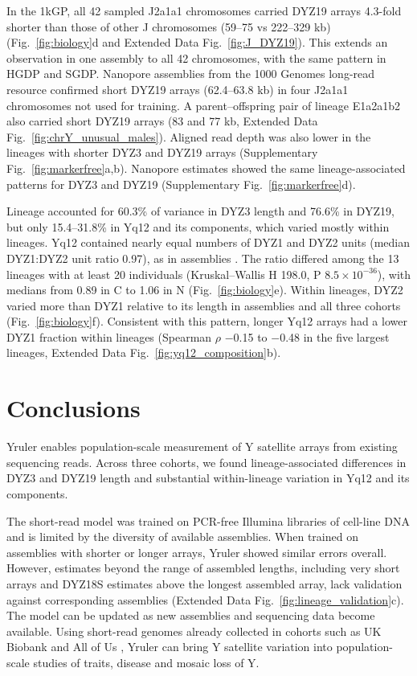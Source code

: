 In the 1kGP, all 42 sampled J2a1a1 chromosomes carried DYZ19 arrays 4.3-fold shorter than those of other J chromosomes (59--75 vs 222--329 kb) (Fig.~\ref{fig:biology}d and Extended Data Fig.~\ref{fig:J_DYZ19}). This extends an observation in one assembly \cite{Hallast2023} to all 42 chromosomes, with the same pattern in HGDP and SGDP. Nanopore assemblies from the 1000 Genomes long-read resource \cite{Gustafson2024} confirmed short DYZ19 arrays (62.4--63.8 kb) in four J2a1a1 chromosomes not used for training. A parent--offspring pair of lineage E1a2a1b2 also carried short DYZ19 arrays (83 and 77 kb, Extended Data Fig.~\ref{fig:chrY_unusual_males}). Aligned read depth was also lower in the lineages with shorter DYZ3 and DYZ19 arrays (Supplementary Fig.~\ref{fig:markerfree}a,b). Nanopore estimates showed the same lineage-associated patterns for DYZ3 and DYZ19 (Supplementary Fig.~\ref{fig:markerfree}d).

Lineage accounted for 60.3\% of variance in DYZ3 length and 76.6\% in DYZ19, but only 15.4--31.8\% in Yq12 and its components, which varied mostly within lineages. Yq12 contained nearly equal numbers of DYZ1 and DYZ2 units (median  DYZ1:DYZ2 unit ratio 0.97), as in assemblies \cite{Hallast2026}. The ratio differed among the 13 lineages with at least 20 individuals (Kruskal--Wallis H 198.0, P $8.5\times10^{-36}$), with medians from 0.89 in C to 1.06 in N (Fig.~\ref{fig:biology}e). Within lineages, DYZ2 varied more than DYZ1 relative to its length in assemblies \cite{Hallast2026} and all three cohorts (Fig.~\ref{fig:biology}f). Consistent with this pattern, longer Yq12 arrays had a lower DYZ1 fraction within lineages (Spearman $\rho$ $-$0.15 to $-$0.48 in the five largest lineages, Extended Data Fig.~\ref{fig:yq12_composition}b).

\section*{Conclusions}
Yruler enables population-scale measurement of Y satellite arrays from existing sequencing reads. Across three cohorts, we found lineage-associated differences in DYZ3 and DYZ19 length and substantial within-lineage variation in Yq12 and its components.

The short-read model was trained on PCR-free Illumina libraries of cell-line DNA and is limited by the diversity of available assemblies. When trained on assemblies with shorter or longer arrays, Yruler showed similar errors overall. However, estimates beyond the range of assembled lengths, including very short arrays and DYZ18S estimates above the longest assembled array, lack validation against corresponding assemblies (Extended Data Fig.~\ref{fig:lineage_validation}c). The model can be updated as new assemblies and sequencing data become available. Using short-read genomes already collected in cohorts such as UK Biobank \cite{UKB2025} and All of Us \cite{AoU2024}, Yruler can bring Y satellite variation into population-scale studies of traits, disease and mosaic loss of Y.


